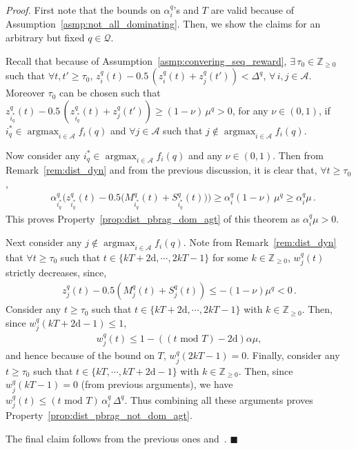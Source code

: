 \documentclass{IEEEtran}
\newcommand{\Mcal}[1]{\mathcal{#1}}
\newcommand{\Mc}[1]{\mathcal{#1}}
\newcommand{\bld}[1]{\mathbf{#1}}
\newcommand{\integer}{\ensuremath{\mathbb{Z}}}
\newcommand{\squaresym}{\hbox{$\blacksquare$}}
\newcommand{\proofend}{\relax\ifmmode\else\unskip\hfill\fi\squaresym}
\renewenvironment{proof}{\textit{Proof.} }{\proofend}
\newcommand{\marginn}[1]{\marginpar{\color{blue}\tiny\ttfamily#1}}
\newcommand{\margin}[1]{\marginpar{\color{magenta}\tiny\ttfamily#1}}
\def \agt{\Mcal{A}}
\def \dg{\mathrm{d}}
\def \fseq{z}
\def \integer{\mathbb{Z}}
\def \intpos{\integer_{\geq 0}}
\def \supp{\mathrm{tsupp}\,}
\def \tsk{\Mc{Q}}
\def \W{\bld{W}}
\DeclareMathOperator*{\argmax}{argmax}
\renewcommand{\mod}{\,\,\mathrm{mod}\,\,}
\begin{document}
\begin{proof}
  First note that the bounds on $\alpha^q_i$'s and $T$ are valid because of
  Assumption~\ref{asmp:not_all_dominating}. Then, we show the claims
  for an arbitrary but fixed $q \in \tsk$.
	
  Recall that because of Assumption~\ref{asmp:convering_seq_reward},
  $\exists \, \tau_0 \in \intpos$ such that
  $\forall t,t' \geq \tau_0$,
  $\fseq^q_i(t) - 0.5 \, (\fseq^q_i(t) + \fseq^q_j(t')) < \Delta^q$,
  $\forall \, i,j \in \agt$. Moreover $\tau_0$ can be chosen such that
  $\fseq^q_{i^*_q}(t) - 0.5 \, (\fseq^q_{i^*_q}(t) + \fseq^q_j(t'))
  \geq (1-\nu)\,\mu^q > 0$, for any $\nu \in (0,1)$, if
  $i^*_q \in \argmax_{i \in \agt} f_i(q)$ and $\forall j \in \agt$
  such that $j \notin \argmax_{i \in \agt} f_i(q)$.
	
  Now consider any $i^*_q \in \argmax_{i \in \agt} f_i(q)$ and any
  $\nu \in (0,1)$. Then from Remark~\ref{rem:dist_dyn} and from the
  previous discussion, it is clear that, $\forall t \geq \tau_0$,
\begin{align*}
  & \alpha^q_{i^*_q} \big(\fseq^q_{i^*_q}(t) - 0.5 \big( M^q_{i^*_q}(t) + S^q_{i^*_q}(t) \big) \big) \geq \alpha^q_i (1-\nu) \, \mu^q \geq \alpha^q_i\mu\,.
\end{align*} 
This proves Property~\ref{prop:dist_pbrag_dom_agt} of this theorem as $\alpha^q_i\mu > 0$.

Next consider any $j \notin \argmax_{i \in \agt} f_i(q)$. Note from
Remark~\ref{rem:dist_dyn} that $\forall t \geq \tau_0$ such that
$t \in \{kT+2\dg,\cdots,2kT-1\}$ for some $k \in \intpos$, $w^q_j(t)$
strictly decreases, since,
\begin{align*}
  \fseq^q_j(t) - 0.5 ( M^q_j(t) + S^q_j(t) ) \leq -(1-\nu)\mu^q < 0\,.
\end{align*} 
Consider any $t \geq \tau_0$ such that
$t \in \{kT+2\dg,\cdots,2kT-1\}$ with $k \in \intpos$. Then, since
$w^q_j(kT+2\dg-1) \leq 1$,
\begin{align*}
	w^q_j(t) \leq 1 - ((t \mod T) - 2\dg)\alpha \mu,
\end{align*}
and hence because of the bound on $T$, $w^q_j(2kT-1) = 0$. Finally,
consider any $t \geq \tau_0$ such that $t \in \{kT,\cdots,kT+2\dg-1\}$
with $k \in \intpos$. Then, since $w^q_j(kT-1) = 0$ (from previous
arguments), we have
$w^q_j(t) \leq (t \mod T) \, \alpha^q_i \, \Delta^q$. Thus combining
all these arguments proves Property~\ref{prop:dist_pbrag_not_dom_agt}.

The final claim follows from the previous ones
and~.
\end{proof}
\end{document}
